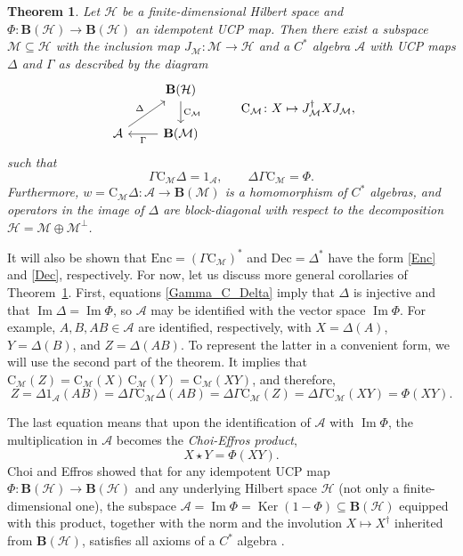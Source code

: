 \documentclass[12pt]{article}
\newcommand{\calA}{\mathcal{A}}
\newcommand{\calH}{\mathcal{H}}
\newcommand{\calM}{\mathcal{M}}
\DeclareMathOperator{\Ker}{Ker}
\DeclareMathOperator{\Img}{Im}
\newcommand{\Bo}{\mathbf{B}}
\newcommand{\Co}{\mathrm{C}}
\newcommand{\Enc}{\mathrm{Enc}}
\newcommand{\Dec}{\mathrm{Dec}}
\newtheorem{Theorem}{Theorem}[section]
\newtheorem[definition]{Definition}[Theorem]{Definition}
\newtheorem[remark]{Example}[Theorem]{Example}
\newtheorem[remark]{Remark}[Theorem]{Remark}
\newtheorem[remark]{Question}[Theorem]{Open question}
\newtheorem*[definition]{definition}{Definition}
\newtheorem*[remark]{example}{Example}
\newtheorem*[remark]{remark}{Remark}
\newtheorem*[remark]{question}{Open question}
\numberwithin{equation}{section}
\begin{document}
\begin{Theorem}\label{th_idemp_structure}
Let $\calH$ be a finite-dimensional Hilbert space and $\Phi\colon\Bo(\calH)\to\Bo(\calH)$ an idempotent UCP map. Then there exist a subspace $\calM\subseteq\calH$ with the inclusion map $J_\calM\colon\calM\to\calH$ and a $C^*$ algebra $\calA$ with UCP maps $\Delta$ and $\Gamma$ as described by the diagram
\begin{equation}
\begin{tikzcd}[ampersand replacement=\&]
\& \Bo(\calH) \arrow[d,"\Co_\calM"] \\
\calA \arrow[ur,"\Delta"] \& \Bo(\calM) \arrow[l,"\Gamma"]
\end{tikzcd}\qquad\quad
\Co_\calM\colon X\mapsto J_\calM^\dag XJ_\calM,
\end{equation}
such that
\begin{equation}\label{Gamma_C_Delta}
\Gamma\Co_\calM\Delta=1_\calA,\qquad \Delta\Gamma\Co_\calM=\Phi.
\end{equation}
Furthermore, $w=\Co_\calM\Delta\colon\calA\to\Bo(\calM)$ is a homomorphism of $C^*$ algebras, and operators in the image of $\Delta$ are block-diagonal with respect to the decomposition $\calH=\calM\oplus\calM^\perp$.
\end{Theorem}

It will also be shown that $\Enc=(\Gamma\Co_\calM)^*$ and $\Dec=\Delta^*$ have the form \eqref{Enc} and \eqref{Dec}, respectively. For now, let us discuss more general corollaries of Theorem~\ref{th_idemp_structure}. First, equations \eqref{Gamma_C_Delta} imply that $\Delta$ is injective and that $\Img\Delta=\Img\Phi$, so $\calA$ may be identified with the vector space $\Img\Phi$. For example, $A,B,AB\in\calA$ are identified, respectively, with $X=\Delta(A)$,\, $Y=\Delta(B)$, and $Z=\Delta(AB)$. To represent the latter in a convenient form, we will use the second part of the theorem. It implies that $\Co_\calM(Z)=\Co_\calM(X)\,\Co_\calM(Y)=\Co_\calM(XY)$, and therefore,
\begin{equation}
Z=\Delta 1_\calA(AB)=\Delta\Gamma\Co_\calM\Delta(AB)
=\Delta\Gamma\Co_\calM(Z)=\Delta\Gamma\Co_\calM(XY)=\Phi(XY).
\end{equation}

The last equation means that upon the identification of $\calA$ with $\Img\Phi$, the multiplication in $\calA$ becomes the \emph{Choi-Effros product},
\begin{equation}
X\star Y=\Phi(XY).
\end{equation}
Choi and Effros showed that for any idempotent UCP map $\Phi\colon\Bo(\calH)\to\Bo(\calH)$ and any underlying Hilbert space $\calH$ (not only a finite-dimensional one), the subspace $\calA=\Img\Phi =\Ker(1-\Phi)\subseteq\Bo(\calH)$ equipped with this product, together with the norm and the involution $X\mapsto X^\dag$ inherited from $\Bo(\calH)$, satisfies all axioms of a $C^*$ algebra \cite[Theorem~3.1]{ChEf77}.
\end{document}
